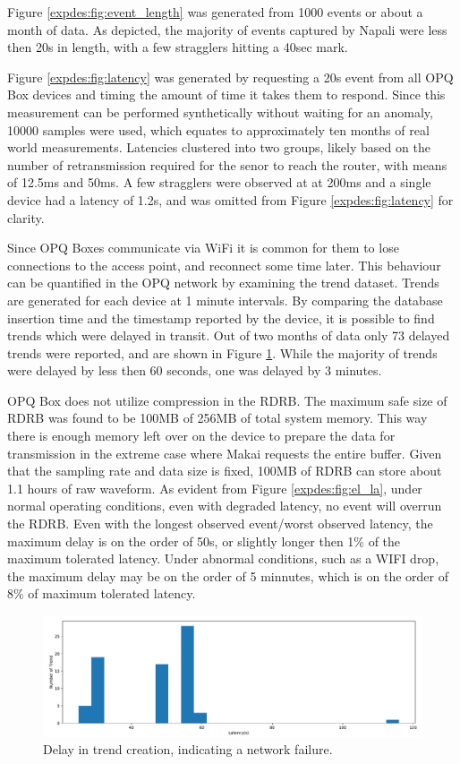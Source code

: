 Figure \ref{expdes:fig:event_length} was generated from 1000 events or about a month of data.
As depicted, the majority of events captured by Napali were less then 20s in length, with a few stragglers hitting a 40sec mark.

Figure \ref{expdes:fig:latency} was generated by requesting a 20s event from all OPQ Box devices and timing the amount of time it takes them to respond.
Since this measurement can be performed synthetically without waiting for an anomaly, 10000 samples were used, which equates to approximately ten months of real world measurements.
Latencies clustered into two groups, likely based on the number of retransmission required for the senor to reach the router, with means of 12.5ms and 50ms.
A few stragglers were observed at at 200ms and a single device had a latency of 1.2s, and was omitted from Figure \ref{expdes:fig:latency} for clarity.

Since OPQ Boxes communicate via WiFi it is common for them to lose connections to the access point, and reconnect some time later.
This behaviour can be quantified in the OPQ network by examining the trend dataset.
Trends are generated for each device at 1 minute intervals.
By comparing the database insertion time and the timestamp reported by the device, it is possible to find trends which were delayed in transit.
Out of two months of data only 73 delayed trends were reported, and are shown in Figure \ref{expdes:fig:trend_latency}.
While the majority of trends were delayed by less then 60 seconds, one was delayed by 3 minutes.

OPQ Box does not utilize compression in the RDRB.
The maximum safe size of RDRB was found to be 100MB of 256MB of total system memory.
This way there is enough memory left over on the device to prepare the data for transmission in the extreme case where Makai requests the entire buffer.
Given that the sampling rate and data size is fixed, 100MB of RDRB can store about 1.1 hours of raw waveform.
As evident from Figure \ref{expdes:fig:el_la}, under normal operating conditions, even with degraded latency, no event will overrun the RDRB.
Even with the longest observed event/worst observed latency, the maximum delay is on the order of 50s, or slightly longer then 1\% of the maximum tolerated latency.
Under abnormal conditions, such as a WIFI drop, the maximum delay may be on the order of 5 minnutes, which is on the order of 8\% of maximum tolerated latency.

\begin{figure}[ht!]
    \centering
    \includegraphics[width=1\linewidth]{img/napali_eval/trend_latency.pdf}
    \caption{Delay in trend creation, indicating a network failure.}
    \label{expdes:fig:trend_latency}
\end{figure}


